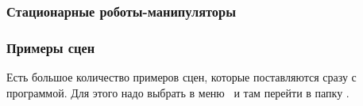 \subsubsection{Стационарные роботы-манипуляторы}


\subsubsection{Примеры сцен}

Есть большое количество примеров сцен, которые поставляются сразу с программой.
Для этого надо выбрать в меню \ и там перейти в 
папку .

